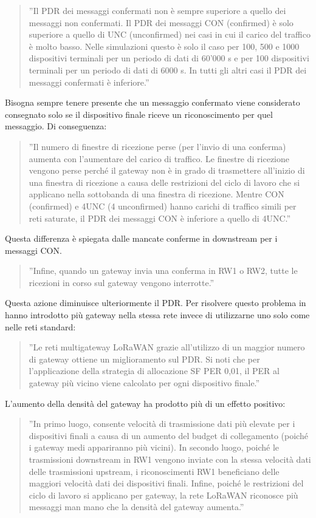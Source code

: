 \documentclass[a4paper]{report} %
\begin{document}
\begin{quote}
	''Il PDR dei messaggi confermati non è sempre superiore a quello dei messaggi non confermati. Il PDR dei messaggi CON (confirmed) è solo superiore a quello di UNC (unconfirmed) nei casi in cui il carico del traffico è molto basso. Nelle simulazioni questo è solo il caso per 100, 500 e 1000 dispositivi terminali per un periodo di dati di 60'000 s e per 100 dispositivi terminali per un periodo di dati di 6000 s. In tutti gli altri casi il PDR dei messaggi confermati è inferiore.''
\end{quote}	
Bisogna sempre tenere presente che un messaggio confermato viene considerato consegnato solo se il dispositivo finale riceve un riconoscimento per quel messaggio. Di conseguenza:
\begin{quote}
	''Il numero di finestre di ricezione perse (per l'invio di una conferma) aumenta con l'aumentare del carico di traffico. Le finestre di ricezione vengono perse perché il gateway non è in grado di trasmettere all'inizio di una finestra di ricezione a causa delle restrizioni del ciclo di lavoro che si applicano nella sottobanda di una finestra di ricezione. Mentre CON (confirmed) e 4UNC (4 unconfirmed) hanno carichi di traffico simili per reti saturate, il PDR dei messaggi CON è inferiore a quello di 4UNC.''
\end{quote}
Questa differenza è spiegata dalle mancate conferme in downstream per i messaggi CON. 
\begin{quote}
	''Infine, quando un gateway invia una conferma in RW1 o RW2, tutte le ricezioni in corso sul gateway vengono interrotte.''
\end{quote}
Questa azione diminuisce ulteriormente il PDR. Per risolvere questo problema in \cite{art:rif.49} hanno introdotto più gateway nella stessa rete invece di utilizzarne uno solo come nelle reti standard:
\begin{quote}
	''Le reti multigateway LoRaWAN grazie all'utilizzo di un maggior numero di gateway ottiene un miglioramento sul PDR. Si noti che per l'applicazione della strategia di allocazione SF PER 0,01, il PER al gateway più vicino viene calcolato per ogni dispositivo finale.''
\end{quote}	
L'aumento della densità del gateway ha prodotto più di un effetto positivo: 
\begin{quote}	
	''In primo luogo, consente velocità di trasmissione dati più elevate per i dispositivi finali a causa di un aumento del budget di collegamento (poiché i gateway medi appariranno più vicini). In secondo luogo, poiché le trasmissioni downstream in RW1 vengono inviate con la stessa velocità dati delle trasmissioni upstream, i riconoscimenti RW1 beneficiano delle maggiori velocità dati dei dispositivi finali. Infine, poiché le restrizioni del ciclo di lavoro si applicano per gateway, la rete LoRaWAN riconosce più messaggi man mano che la densità del gateway aumenta.'' 
\end{quote}
\end{document}
